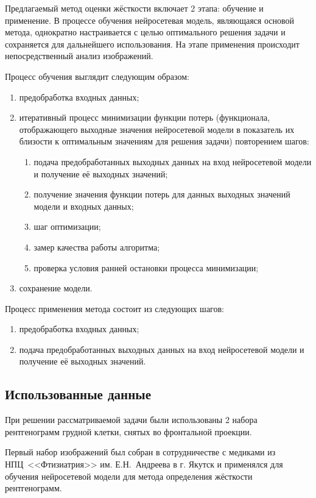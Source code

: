 Предлагаемый метод оценки жёсткости включает 2 этапа: обучение и применение. В процессе обучения нейросетевая модель, являющаяся основой метода, однократно настраивается с целью оптимального решения задачи и сохраняется для дальнейшего использования. На этапе применения происходит непосредственный анализ изображений.

Процесс обучения выглядит следующим образом:
\begin{enumerate}[beginpenalty=10000]
	\item предобработка входных данных;
	\item итеративный процесс минимизации функции потерь (функционала, отображающего выходные значения нейросетевой модели в показатель их близости к оптимальным значениям для решения задачи) повторением шагов:
	\begin{enumerate}[beginpenalty=10000]
		\item подача предобработанных выходных данных на вход нейросетевой модели и получение её выходных значений;
		\item получение значения функции потерь для данных выходных значений модели и входных данных;
		\item шаг оптимизации;
		\item замер качества работы алгоритма;
		\item проверка условия ранней остановки процесса минимизации;
	\end{enumerate}
	\item сохранение модели.	
\end{enumerate}

Процесс применения метода состоит из следующих шагов:
\begin{enumerate}[beginpenalty=10000]
	\item предобработка входных данных;
	\item подача предобработанных выходных данных на вход нейросетевой модели и получение её выходных значений.
\end{enumerate}

\subsection{Использованные данные}

При решении рассматриваемой задачи были использованы 2 набора рентгенограмм грудной клетки, снятых во фронтальной проекции.

Первый набор изображений был собран в сотрудничестве с медиками из НПЦ~<<Фтизиатрия>> им. Е.Н.~Андреева в г. Якутск и применялся для обучения нейросетевой модели для метода определения жёсткости рентгенограмм.

